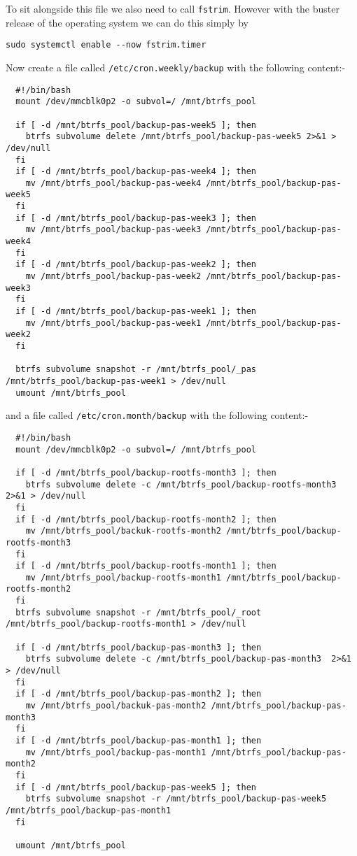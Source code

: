 \documentclass[Draft]{akc}
\begin{document}
To sit alongside this file we also need to call \texttt{fstrim}.  However with the buster release of
the operating system we can do this simply by
\begin{lstlisting}
sudo systemctl enable --now fstrim.timer
\end{lstlisting}

Now create a file called \texttt{/etc/cron.weekly/backup} with the following content:-

\begin{lstlisting}
  #!/bin/bash
  mount /dev/mmcblk0p2 -o subvol=/ /mnt/btrfs_pool

  if [ -d /mnt/btrfs_pool/backup-pas-week5 ]; then
    btrfs subvolume delete /mnt/btrfs_pool/backup-pas-week5 2>&1 > /dev/null
  fi
  if [ -d /mnt/btrfs_pool/backup-pas-week4 ]; then
    mv /mnt/btrfs_pool/backup-pas-week4 /mnt/btrfs_pool/backup-pas-week5
  fi
  if [ -d /mnt/btrfs_pool/backup-pas-week3 ]; then
    mv /mnt/btrfs_pool/backup-pas-week3 /mnt/btrfs_pool/backup-pas-week4
  fi
  if [ -d /mnt/btrfs_pool/backup-pas-week2 ]; then
    mv /mnt/btrfs_pool/backup-pas-week2 /mnt/btrfs_pool/backup-pas-week3
  fi
  if [ -d /mnt/btrfs_pool/backup-pas-week1 ]; then
    mv /mnt/btrfs_pool/backup-pas-week1 /mnt/btrfs_pool/backup-pas-week2
  fi

  btrfs subvolume snapshot -r /mnt/btrfs_pool/_pas /mnt/btrfs_pool/backup-pas-week1 > /dev/null
  umount /mnt/btrfs_pool

\end{lstlisting}

and a file called \texttt{/etc/cron.month/backup} with the following content:-

\begin{lstlisting}
  #!/bin/bash
  mount /dev/mmcblk0p2 -o subvol=/ /mnt/btrfs_pool

  if [ -d /mnt/btrfs_pool/backup-rootfs-month3 ]; then
    btrfs subvolume delete -c /mnt/btrfs_pool/backup-rootfs-month3 2>&1 > /dev/null
  fi
  if [ -d /mnt/btrfs_pool/backup-rootfs-month2 ]; then
    mv /mnt/btrfs_pool/backuk-rootfs-month2 /mnt/btrfs_pool/backup-rootfs-month3
  fi
  if [ -d /mnt/btrfs_pool/backup-rootfs-month1 ]; then
    mv /mnt/btrfs_pool/backup-rootfs-month1 /mnt/btrfs_pool/backup-rootfs-month2
  fi
  btrfs subvolume snapshot -r /mnt/btrfs_pool/_root /mnt/btrfs_pool/backup-rootfs-month1 > /dev/null

  if [ -d /mnt/btrfs_pool/backup-pas-month3 ]; then
    btrfs subvolume delete -c /mnt/btrfs_pool/backup-pas-month3  2>&1 > /dev/null
  fi
  if [ -d /mnt/btrfs_pool/backup-pas-month2 ]; then
    mv /mnt/btrfs_pool/backuk-pas-month2 /mnt/btrfs_pool/backup-pas-month3
  fi
  if [ -d /mnt/btrfs_pool/backup-pas-month1 ]; then
    mv /mnt/btrfs_pool/backup-pas-month1 /mnt/btrfs_pool/backup-pas-month2
  fi
  if [ -d /mnt/btrfs_pool/backup-pas-week5 ]; then
    btrfs subvolume snapshot -r /mnt/btrfs_pool/backup-pas-week5 /mnt/btrfs_pool/backup-pas-month1
  fi

  umount /mnt/btrfs_pool

\end{lstlisting}
\end{document}
